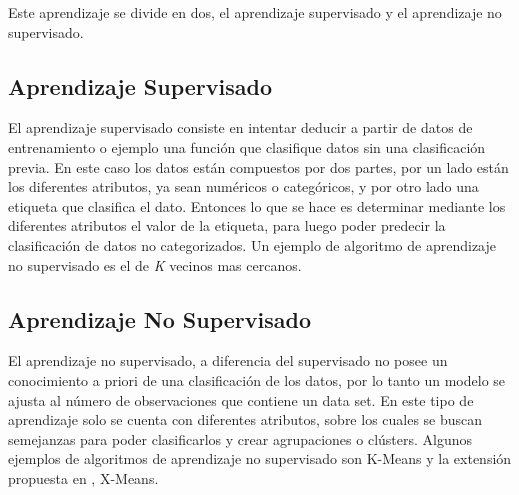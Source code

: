 Este aprendizaje se divide en dos, el aprendizaje supervisado y el aprendizaje no supervisado.

\subsection{Aprendizaje Supervisado}

El aprendizaje supervisado consiste en intentar deducir a partir de datos de entrenamiento o ejemplo una función que clasifique datos sin una clasificación previa. En este caso los datos están compuestos por dos partes, por un lado están los diferentes atributos, ya sean numéricos o categóricos, y por otro lado una etiqueta que clasifica el dato. Entonces lo que se hace es determinar mediante los diferentes atributos el valor de la etiqueta, para luego poder predecir la clasificación de datos no categorizados. Un ejemplo de algoritmo de aprendizaje no supervisado es el de \textit{K} vecinos mas cercanos.

\subsection{Aprendizaje No Supervisado}

El aprendizaje no supervisado, a diferencia del supervisado no posee un conocimiento a priori de una clasificación de los datos, por lo tanto un modelo se ajusta al número de observaciones que contiene un data set. En este tipo de aprendizaje solo se cuenta con diferentes atributos, sobre los cuales se buscan semejanzas para poder clasificarlos y crear agrupaciones o clústers. Algunos ejemplos de algoritmos de aprendizaje no supervisado son K-Means y la extensión propuesta en \cite{Pelleg00x-means:extending}, X-Means.